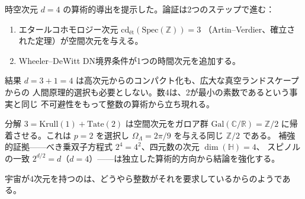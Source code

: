\documentclass[12pt,a4paper]{article}
\theoremstyle{definition}
\newcommand{\Spec}{\mathrm{Spec}}
\newcommand{\Gal}{\mathrm{Gal}}
\newcommand{\cd}{\mathrm{cd}}
\newcommand{\Krull}{\mathrm{Krull}}
\newcommand{\ZZ}{\mathbb{Z}}
\newcommand{\RR}{\mathbb{R}}
\newcommand{\CC}{\mathbb{C}}
\newcommand{\HH}{\mathbb{H}}
\begin{document}
時空次元 $d=4$ の算術的導出を提示した。論証は2つのステップで進む：
\begin{enumerate}
  \item エタールコホモロジー次元 $\cd_{\text{\'et}}(\Spec(\ZZ)) = 3$
    （Artin--Verdier、確立された定理）が空間次元を与える。
  \item Wheeler--DeWitt DN境界条件が1つの時間次元を追加する。
\end{enumerate}

結果 $d = 3 + 1 = 4$ は高次元からのコンパクト化も、広大な真空ランドスケープからの
人間原理的選択も必要としない。数4は、2が最小の素数であるという事実と同じ
不可避性をもって整数の算術から立ち現れる。

分解 $3 = \Krull(1) + \mathrm{Tate}(2)$ は空間次元をガロア群
$\Gal(\CC/\RR) = \ZZ/2$ に帰着させる。これは $p=2$ を選択し
$\Omega_\Lambda = 2\pi/9$ を与える同じ $\ZZ/2$ である。
補強的証拠——べき乗双子方程式 $2^4 = 4^2$、四元数の次元 $\dim(\HH) = 4$、
スピノルの一致 $2^{d/2} = d$（$d=4$）——は独立した算術的方向から結論を強化する。

宇宙が4次元を持つのは、どうやら整数がそれを要求しているからのようである。

\end{document}
